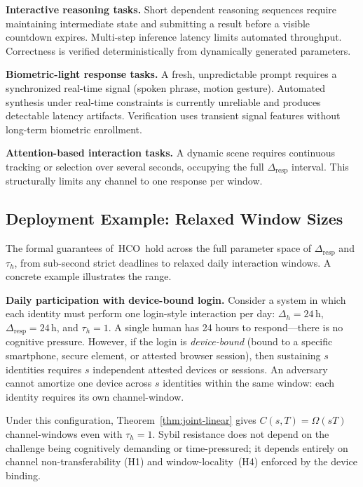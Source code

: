 \documentclass[11pt]{article}
\newcommand{\HCO}{HCO\xspace}
\theoremstyle{remark}
\theoremstyle{plain}
\begin{document}
	\noindent\textbf{Interactive reasoning tasks.}
	Short dependent reasoning sequences require maintaining intermediate
	state and submitting a result before a visible countdown expires.
	Multi-step inference latency limits automated throughput. Correctness
	is verified deterministically from dynamically generated parameters.
	
	\noindent\textbf{Biometric-light response tasks.}
	A fresh, unpredictable prompt requires a synchronized real-time signal
	(spoken phrase, motion gesture). Automated synthesis under real-time
	constraints is currently unreliable and produces detectable latency
	artifacts. Verification uses transient signal features without
	long-term biometric enrollment.
	
	\noindent\textbf{Attention-based interaction tasks.}
	A dynamic scene requires continuous tracking or selection over several
	seconds, occupying the full $\Delta_{\mathrm{resp}}$ interval. This
	structurally limits any channel to one response per window.
	
	\subsection{Deployment Example: Relaxed Window Sizes}
	\label{sec:deployment-example}
	
	The formal guarantees of~\HCO\ hold across the full parameter space of
	$\Delta_{\mathrm{resp}}$ and $\tau_h$, from sub-second strict deadlines
	to relaxed daily interaction windows. A concrete example illustrates
	the range.
	
	\noindent\textbf{Daily participation with device-bound login.}
	Consider a system in which each identity must perform one login-style
	interaction per day: $\Delta_h = 24\,\text{h}$, $\Delta_{\mathrm{resp}}
	= 24\,\text{h}$, and $\tau_h = 1$. A single human has 24 hours to
	respond---there is no cognitive pressure. However, if the login is
	\emph{device-bound} (bound to a specific smartphone, secure element, or
	attested browser session), then sustaining $s$ identities requires $s$
	independent attested devices or sessions. An adversary cannot amortize
	one device across $s$ identities within the same window: each identity
	requires its own channel-window.
	
	Under this configuration, Theorem~\ref{thm:joint-linear} gives
	$C(s,T) = \Omega(sT)$ channel-windows even with $\tau_h = 1$. Sybil
	resistance does not depend on the challenge being cognitively demanding
	or time-pressured; it depends entirely on channel non-transferability
	(H1) and window-locality~(H4) enforced by the device binding.
	
\end{document}
